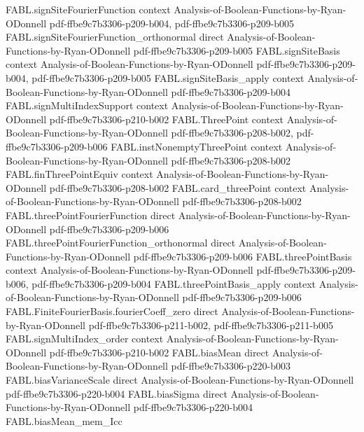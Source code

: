 \begin{theorem}
\proofstep
  {FABL.signSiteFourierFunction}
  {context}
  {Analysis-of-Boolean-Functions-by-Ryan-ODonnell}
  {pdf-ffbe9c7b3306-p209-b004,
    pdf-ffbe9c7b3306-p209-b005}
\proofstep
  {FABL.signSiteFourierFunction_orthonormal}
  {direct}
  {Analysis-of-Boolean-Functions-by-Ryan-ODonnell}
  {pdf-ffbe9c7b3306-p209-b005}
\proofstep
  {FABL.signSiteBasis}
  {context}
  {Analysis-of-Boolean-Functions-by-Ryan-ODonnell}
  {pdf-ffbe9c7b3306-p209-b004,
    pdf-ffbe9c7b3306-p209-b005}
\proofstep
  {FABL.signSiteBasis_apply}
  {context}
  {Analysis-of-Boolean-Functions-by-Ryan-ODonnell}
  {pdf-ffbe9c7b3306-p209-b004}
\proofstep
  {FABL.signMultiIndexSupport}
  {context}
  {Analysis-of-Boolean-Functions-by-Ryan-ODonnell}
  {pdf-ffbe9c7b3306-p210-b002}
\proofstep
  {FABL.ThreePoint}
  {context}
  {Analysis-of-Boolean-Functions-by-Ryan-ODonnell}
  {pdf-ffbe9c7b3306-p208-b002,
    pdf-ffbe9c7b3306-p209-b006}
\proofstep
  {FABL.instNonemptyThreePoint}
  {context}
  {Analysis-of-Boolean-Functions-by-Ryan-ODonnell}
  {pdf-ffbe9c7b3306-p208-b002}
\proofstep
  {FABL.finThreePointEquiv}
  {context}
  {Analysis-of-Boolean-Functions-by-Ryan-ODonnell}
  {pdf-ffbe9c7b3306-p208-b002}
\proofstep
  {FABL.card_threePoint}
  {context}
  {Analysis-of-Boolean-Functions-by-Ryan-ODonnell}
  {pdf-ffbe9c7b3306-p208-b002}
\proofstep
  {FABL.threePointFourierFunction}
  {direct}
  {Analysis-of-Boolean-Functions-by-Ryan-ODonnell}
  {pdf-ffbe9c7b3306-p209-b006}
\proofstep
  {FABL.threePointFourierFunction_orthonormal}
  {direct}
  {Analysis-of-Boolean-Functions-by-Ryan-ODonnell}
  {pdf-ffbe9c7b3306-p209-b006}
\proofstep
  {FABL.threePointBasis}
  {context}
  {Analysis-of-Boolean-Functions-by-Ryan-ODonnell}
  {pdf-ffbe9c7b3306-p209-b006,
    pdf-ffbe9c7b3306-p209-b004}
\proofstep
  {FABL.threePointBasis_apply}
  {context}
  {Analysis-of-Boolean-Functions-by-Ryan-ODonnell}
  {pdf-ffbe9c7b3306-p209-b006}
\proofstep
  {FABL.FiniteFourierBasis.fourierCoeff_zero}
  {direct}
  {Analysis-of-Boolean-Functions-by-Ryan-ODonnell}
  {pdf-ffbe9c7b3306-p211-b002,
    pdf-ffbe9c7b3306-p211-b005}
\proofstep
  {FABL.signMultiIndex_order}
  {context}
  {Analysis-of-Boolean-Functions-by-Ryan-ODonnell}
  {pdf-ffbe9c7b3306-p210-b002}
\proofstep
  {FABL.biasMean}
  {direct}
  {Analysis-of-Boolean-Functions-by-Ryan-ODonnell}
  {pdf-ffbe9c7b3306-p220-b003}
\proofstep
  {FABL.biasVarianceScale}
  {direct}
  {Analysis-of-Boolean-Functions-by-Ryan-ODonnell}
  {pdf-ffbe9c7b3306-p220-b004}
\proofstep
  {FABL.biasSigma}
  {direct}
  {Analysis-of-Boolean-Functions-by-Ryan-ODonnell}
  {pdf-ffbe9c7b3306-p220-b004}
\proofstep
  {FABL.biasMean_mem_Icc}

\end{theorem}
